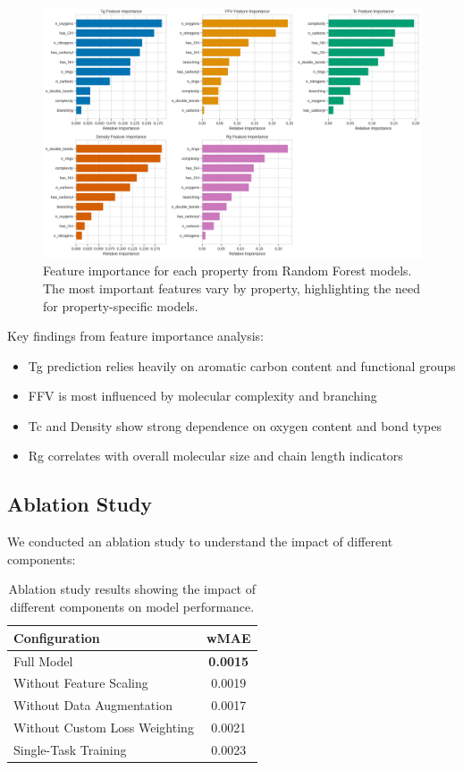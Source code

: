 \documentclass[10pt,twocolumn,letterpaper]{article}
\begin{document}
\begin{figure}[h]
\centering
\includegraphics[width=0.9\linewidth]{figures/feature_importance.png}
\caption{Feature importance for each property from Random Forest models. The most important features vary by property, highlighting the need for property-specific models.}
\label{fig:feature_importance}
\end{figure}

Key findings from feature importance analysis:
\begin{itemize}
    \item Tg prediction relies heavily on aromatic carbon content and functional groups
    \item FFV is most influenced by molecular complexity and branching
    \item Tc and Density show strong dependence on oxygen content and bond types
    \item Rg correlates with overall molecular size and chain length indicators
\end{itemize}

\subsection{Ablation Study}

We conducted an ablation study to understand the impact of different components:

\begin{table}[h]
\centering
\begin{tabular}{lc}
\toprule
\textbf{Configuration} & \textbf{wMAE} \\
\midrule
Full Model & \textbf{0.0015} \\
Without Feature Scaling & 0.0019 \\
Without Data Augmentation & 0.0017 \\
Without Custom Loss Weighting & 0.0021 \\
Single-Task Training & 0.0023 \\
\bottomrule
\end{tabular}
\caption{Ablation study results showing the impact of different components on model performance.}
\label{tab:ablation}
\end{table}
\end{document}
